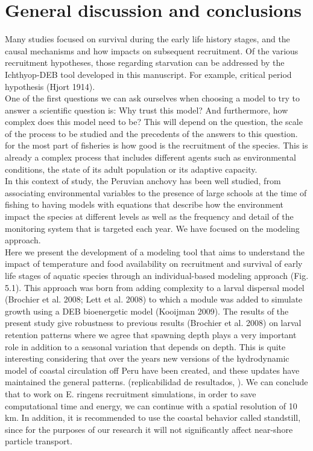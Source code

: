 \chapter{General discussion and conclusions}\label{Chap5}

Many studies focused on survival during the early life history stages, and the causal mechanisms and how impacts on subsequent recruitment. Of the various recruitment hypotheses, those regarding starvation can be addressed by the Ichthyop-DEB tool developed in this manuscript. For example, critical period hypothesis (Hjort 1914).\\

One of the first questions we can ask ourselves when choosing a model to try to answer a scientific question is: Why trust this model? And furthermore, how complex does this model need to be? This will depend on the question, the scale of the process to be studied and the precedents of the answers to this question.\\

for the most part of fisheries is how good is the recruitment of the species. This is already a complex process that includes different agents such as environmental conditions, the state of its adult population or its adaptive capacity.\\
 
In this context of study, the Peruvian anchovy has been well studied, from associating environmental variables to the presence of large schools at the time of fishing to having models with equations that describe how the environment impact the species at different levels as well as the frequency and detail of the monitoring system that is targeted each year. We have focused on the modeling approach.\\

Here we present the development of a modeling tool that aims to understand the impact of temperature and food availability on recruitment and survival of early life stages of aquatic species through an individual-based modeling approach (Fig. 5.1). This approach was born from adding complexity to a larval dispersal model (Brochier et al. 2008; Lett et al. 2008) to which a module was added to simulate growth using a DEB bioenergetic model (Kooijman 2009). The results of the present study give robustness to previous results (Brochier et al. 2008) on larval retention patterns where we agree that spawning depth plays a very important role in addition to a seasonal variation that depends on depth. This is quite interesting considering that over the years new versions of the hydrodynamic model of coastal circulation off Peru have been created, and these updates have maintained the general patterns. (replicabilidad de resultados, ). We can conclude that to work on E. ringens recruitment simulations, in order to save computational time and energy, we can continue with a spatial resolution of 10 km. In addition, it is recommended to use the coastal behavior called standstill, since for the purposes of our research it will not significantly affect near-shore particle transport.\\

